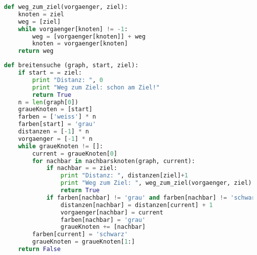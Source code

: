 \begin{lsg}
\hfill
\begin{lstlisting}[language=Python,basicstyle=\small,tabsize=3]
def weg_zum_ziel(vorgaenger, ziel):
	knoten = ziel
	weg = [ziel]	
	while vorgaenger[knoten] != -1:
		weg = [vorgaenger[knoten]] + weg
		knoten = vorgaenger[knoten]
	return weg
\end{lstlisting}
\end{lsg}

\begin{lsg}
\hfill
\begin{lstlisting}[language=Python,basicstyle=\small,tabsize=3]
def breitensuche (graph, start, ziel):
	if start = = ziel:
		print "Distanz: ", 0
		print "Weg zum Ziel: schon am Ziel!"
		return True
	n = len(graph[0])
	graueKnoten = [start]
	farben = ['weiss'] * n
	farben[start] = 'grau'
	distanzen = [-1] * n
	vorgaenger = [-1] * n
	while graueKnoten != []:
		current = graueKnoten[0]
		for nachbar in nachbarsknoten(graph, current):
			if nachbar = = ziel:
				print "Distanz: ", distanzen[ziel]+1
				print "Weg zum Ziel: ", weg_zum_ziel(vorgaenger, ziel)
				return True
			if farben[nachbar] != 'grau' and farben[nachbar] != 'schwarz':
				distanzen[nachbar] = distanzen[current] + 1
				vorgaenger[nachbar] = current
				farben[nachbar] = 'grau'
				graueKnoten += [nachbar]
		farben[current] = 'schwarz'
		graueKnoten = graueKnoten[1:]
	return False
\end{lstlisting}
\end{lsg}

